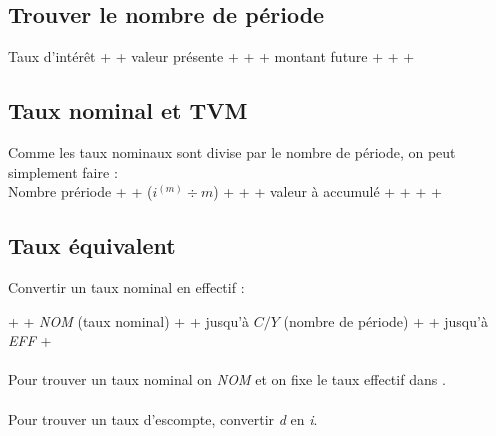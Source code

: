 \subsection{Trouver le nombre de période}
Taux d'intérêt +  + valeur présente + \fbox{+$ / $- } +  + montant future +  +  + 

\subsection{Taux nominal et TVM}
Comme les taux nominaux sont divise par le nombre de période, on peut simplement faire : \\
Nombre prériode +  + ($i^{(m)} \div m$) + \fbox{=} +  + valeur à accumulé + \fbox{+$ / $-} +  +  + 
\\

\subsection{Taux équivalent}

Convertir un taux nominal en effectif : 

 +  + \emph{NOM} (taux nominal) +  + \fbox{$\Downarrow$} jusqu'à \emph{$C / Y$} (nombre de période) +  + \fbox{$\Uparrow$} jusqu'à \emph{EFF} + 
\\
\\ Pour trouver un taux nominal on  \emph{NOM} et on fixe le taux effectif dans .
\\
\\ Pour trouver un taux d'escompte, convertir \emph{d} en \emph{i}.


